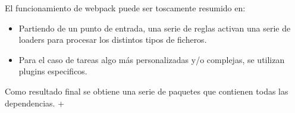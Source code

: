 \bigskip 
El funcionamiento de webpack puede ser toscamente resumido en:

\begin{itemize}

\item Partiendo de un punto de entrada, una serie de reglas activan una serie de loaders
para procesar los distintos tipos de ficheros. 

\item Para el caso de tareas algo más personalizadas y/o complejas, se utilizan plugins especificos.

\end{itemize}

Como resultado final se obtiene una serie de paquetes que contienen todas las dependencias. +

\bigskip 
